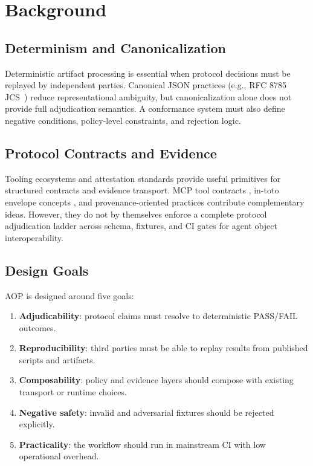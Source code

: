 \documentclass[10pt,conference]{IEEEtran}
\begin{document}
\section{Background}

\subsection{Determinism and Canonicalization}

Deterministic artifact processing is essential when protocol decisions must be
replayed by independent parties. Canonical JSON practices (e.g., RFC 8785
JCS~\cite{rfc8785}) reduce representational ambiguity, but canonicalization
alone does not provide full adjudication semantics. A conformance system must
also define negative conditions, policy-level constraints, and rejection logic.

\subsection{Protocol Contracts and Evidence}

Tooling ecosystems and attestation standards provide useful primitives for
structured contracts and evidence transport. MCP tool contracts
\cite{mcp_tools_20250618}, in-toto envelope concepts
\cite{intoto_envelope_v1}, and provenance-oriented practices
\cite{slsa_prov_v11} contribute complementary ideas. However, they do not by
themselves enforce a complete protocol adjudication ladder across schema,
fixtures, and CI gates for agent object interoperability.

\subsection{Design Goals}

AOP is designed around five goals:
\begin{enumerate}
\item \textbf{Adjudicability}: protocol claims must resolve to deterministic
      PASS/FAIL outcomes.
\item \textbf{Reproducibility}: third parties must be able to replay results
      from published scripts and artifacts.
\item \textbf{Composability}: policy and evidence layers should compose with
      existing transport or runtime choices.
\item \textbf{Negative safety}: invalid and adversarial fixtures should be
      rejected explicitly.
\item \textbf{Practicality}: the workflow should run in mainstream CI with
      low operational overhead.
\end{enumerate}
\end{document}

